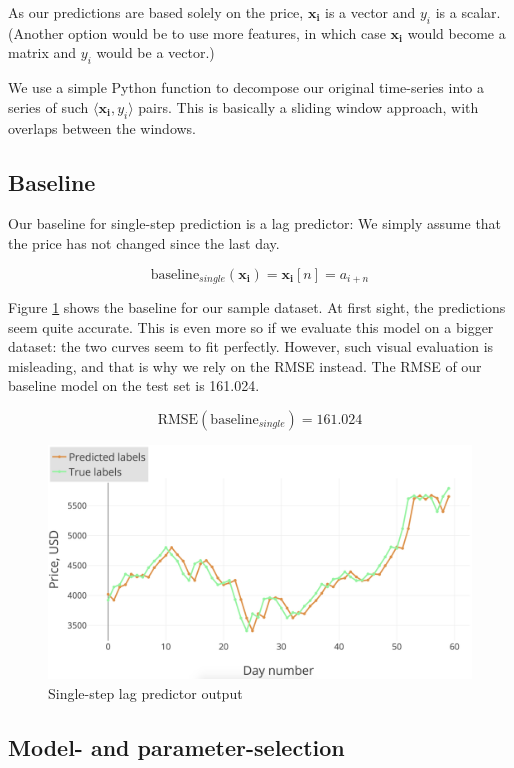 \documentclass{article}
\begin{document}
As our predictions are based solely on the price, $\mathbf{x_i}$ is a vector and $y_i$ is a scalar. (Another option would be to use more features, in which case $\mathbf{x_i}$ would become a matrix and $y_i$ would be a vector.)

We use a simple Python function to decompose our original time-series into a series of such $\langle\mathbf{x_i}, y_i\rangle$  pairs. This is basically a sliding window approach, with overlaps between the windows.

\subsection{Baseline}
\label{sec:single-baseline}

Our baseline for single-step prediction is a lag predictor: We simply assume that the price has not changed since the last day. 

\vspace{-1.2em}
$$\textrm{baseline}_{single}(\mathbf{x_i}) = \mathbf{x_i}[n] = a_{i+n}$$

Figure \ref{fig:single-baseline} shows the baseline for our sample dataset. At first sight, the predictions seem quite accurate. This is even more so if we evaluate this model on a bigger dataset: the two curves seem to fit perfectly. However, such visual evaluation is misleading, and that is why we rely on the RMSE instead. The RMSE of our baseline model on the test set is 161.024.

$$\textrm{RMSE}(\textrm{baseline}_{single}) = 161.024$$

\begin{figure}
\centering
\includegraphics[width=0.9\columnwidth]{images/single-baseline.png}
\caption{Single-step lag predictor output}
\label{fig:single-baseline}
\end{figure}

\subsection{Model- and parameter-selection}
\end{document}
